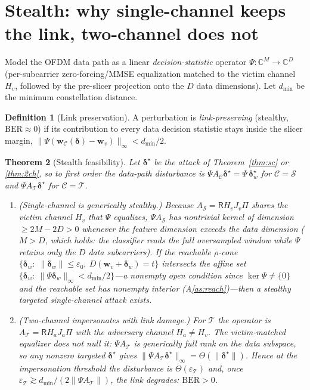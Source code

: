 \documentclass[11pt]{article}
\newtheorem{theorem}{Theorem}
\theoremstyle{definition}
\newtheorem{definition}[theorem]{Definition}
\newcommand{\C}{\mathbb{C}}
\newcommand{\norm}[1]{\lVert #1 \rVert}
\newcommand{\Rx}{\mathsf{R}}
\newcommand{\bw}{\bm{w}}
\newcommand{\bd}{\bm{\delta}}
\begin{document}
\section{Stealth: why single-channel keeps the link, two-channel does not}

Model the OFDM data path as a linear \emph{decision-statistic} operator
$\Psi:\C^{M}\to\C^{D}$ (per-subcarrier zero-forcing/MMSE equalization matched to the victim
channel $H_v$, followed by the pre-slicer projection onto the $D$ data dimensions). Let
$d_{\min}$ be the minimum constellation distance.

\begin{definition}[Link preservation]
A perturbation is \emph{link-preserving} (stealthy, $\mathrm{BER}\approx0$) if its contribution
to every data decision statistic stays inside the slicer margin,
$\norm{\Psi(\bw_{\mathcal C}(\bd)-\bw_v)}_\infty< d_{\min}/2$.
\end{definition}

\begin{theorem}[Stealth feasibility]\label{thm:stealth}
Let $\bd^\star$ be the attack of Theorem~\ref{thm:sc} or \ref{thm:2ch}, so to first order the
data-path disturbance is $\Psi A_{\mathcal C}\bd^\star=\Psi\,\bd_w^\star$ for $\mathcal C=\mathcal
S$ and $\Psi A_{\mathcal T}\bd^\star$ for $\mathcal C=\mathcal T$.
\begin{enumerate}
\item[(i)] \emph{(Single-channel is generically stealthy.)} Because
$A_{\mathcal S}=\Rx H_v J_v\Pi$ shares the victim channel $H_v$ that $\Psi$ equalizes,
$\Psi A_{\mathcal S}$ has nontrivial kernel of dimension $\ge 2M-2D>0$ whenever the feature
dimension exceeds the data dimension ($M>D$, which holds: the classifier reads the full
oversampled window while $\Psi$ retains only the $D$ data subcarriers). If the reachable
$\rho$-cone $\{\bd_w:\;\norm{\bd_w}\le\varepsilon_0,\ D(\bw_v+\bd_w)=t\}$ intersects the affine
set $\{\bd_w:\ \norm{\Psi\bd_w}_\infty<d_{\min}/2\}$---a nonempty open condition since
$\ker\Psi\neq\{0\}$ and the reachable set has nonempty interior (A\ref{as:reach})---then a
\emph{stealthy} targeted single-channel attack exists.
\item[(ii)] \emph{(Two-channel impersonates with link damage.)} For $\mathcal T$ the operator
is $A_{\mathcal T}=\Rx H_a J_a\Pi$ with the \emph{adversary} channel $H_a\neq H_v$. The
victim-matched equalizer does not null it: $\Psi A_{\mathcal T}$ is generically full rank on the
data subspace, so any nonzero targeted $\bd^\star$ gives
$\norm{\Psi A_{\mathcal T}\bd^\star}_\infty=\Theta(\norm{\bd^\star})$. Hence at the impersonation
threshold the disturbance is $\Theta(\varepsilon_{\mathcal T})$ and, once
$\varepsilon_{\mathcal T}\gtrsim d_{\min}/(2\norm{\Psi A_{\mathcal T}})$, the link degrades:
$\mathrm{BER}>0$.
\end{enumerate}
\end{theorem}
\end{document}
